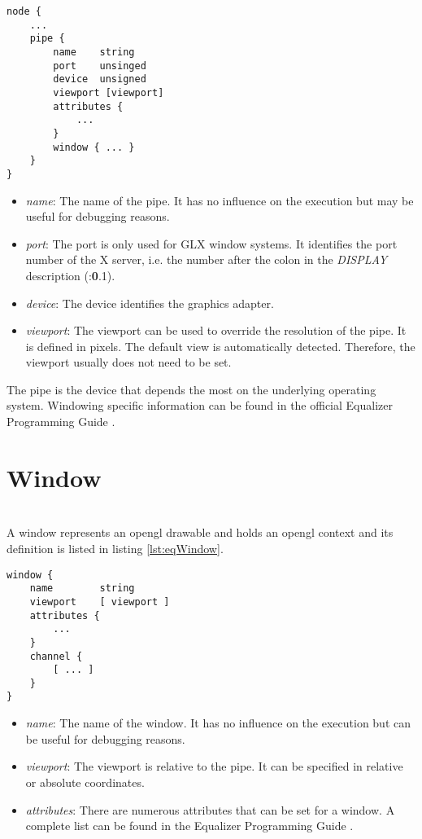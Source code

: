 \begin{lstlisting}[language=vrml,caption={Pipe section in Equalizer configuration},label={lst:eqPipe}]
node {
	...
	pipe {
		name	string
		port	unsinged
		device	unsigned
		viewport [viewport]
		attributes {
			...
		}
		window { ... }
	}
}
\end{lstlisting}

\begin{itemize}
	\item \emph{name}: The name of the pipe. It has no influence on the execution but may be useful for debugging reasons.
	\item \emph{port}: The port is only used for GLX window systems. It identifies the port number of the X server, i.e. the number after the colon in the \emph{DISPLAY} description (:\textbf{0}.1).
	\item \emph{device}: The device identifies the graphics adapter. 
	\item \emph{viewport}: The viewport can be used to override the resolution of the pipe. It is defined in pixels. The default view is automatically detected. Therefore, the viewport usually does not need to be set.
\end{itemize}

The pipe is the device that depends the most on the underlying operating system. Windowing specific information can be found in the official Equalizer Programming Guide \cite[p. 67]{eqPG}.

\section{Window}
\label{sec:eqWindow}\hfill\\
A window represents an \gls{opengl} drawable and holds an \gls{opengl} context and its definition is listed in listing \ref{lst:eqWindow}.

\begin{lstlisting}[language=vrml,caption={Window section in Equalizer configuration},label={lst:eqWindow}]
window {
	name 		string
	viewport	[ viewport ]
	attributes {
		...
	}
	channel {
		[ ... ]
	}
}
\end{lstlisting}

\begin{itemize}
	\item \emph{name}: The name of the window. It has no influence on the execution but can be useful for debugging reasons.
	\item \emph{viewport}: The viewport is relative to the pipe. It can be specified in relative or absolute coordinates.
	\item \emph{attributes}: There are numerous attributes that can be set for a window. A complete list can be found in the Equalizer Programming Guide \cite[p.67-68]{eqPG}.
\end{itemize}

